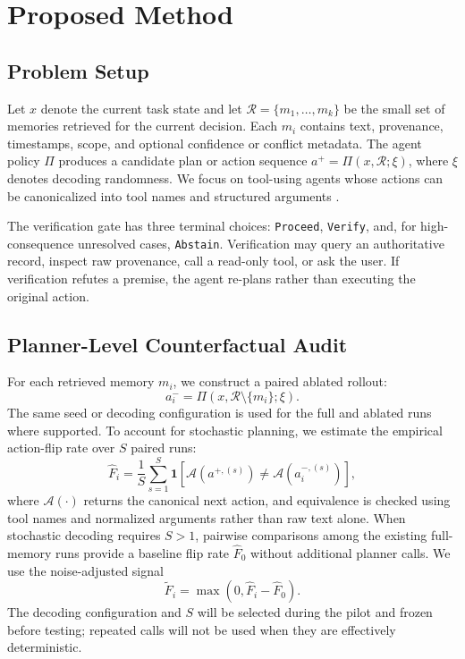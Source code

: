 \documentclass[11pt]{article}
\newcommand{\R}{\mathcal{R}}
\newcommand{\A}{\mathcal{A}}
\begin{document}
\section{Proposed Method}

\subsection{Problem Setup}

Let $x$ denote the current task state and let $\R=\{m_1,\ldots,m_k\}$ be the small set of memories retrieved for the current decision. Each $m_i$ contains text, provenance, timestamps, scope, and optional confidence or conflict metadata. The agent policy $\Pi$ produces a candidate plan or action sequence $a^{+}=\Pi(x,\R;\xi)$, where $\xi$ denotes decoding randomness. We focus on tool-using agents whose actions can be canonicalized into tool names and structured arguments \cite{yao2023react}.

The verification gate has three terminal choices: \texttt{Proceed}, \texttt{Verify}, and, for high-consequence unresolved cases, \texttt{Abstain}. Verification may query an authoritative record, inspect raw provenance, call a read-only tool, or ask the user. If verification refutes a premise, the agent re-plans rather than executing the original action.

\subsection{Planner-Level Counterfactual Audit}

For each retrieved memory $m_i$, we construct a paired ablated rollout:
\begin{equation}
  a_i^{-}=\Pi\!\left(x,\R\setminus\{m_i\};\xi\right).
\end{equation}
The same seed or decoding configuration is used for the full and ablated runs where supported. To account for stochastic planning, we estimate the empirical action-flip rate over $S$ paired runs:
\begin{equation}
  \widehat{F}_i=\frac{1}{S}\sum_{s=1}^{S}
  \mathbf{1}\!\left[\A\!\left(a^{+,(s)}\right)\neq
  \A\!\left(a_i^{-,(s)}\right)\right],
\end{equation}
where $\A(\cdot)$ returns the canonical next action, and equivalence is checked using tool names and normalized arguments rather than raw text alone. When stochastic decoding requires $S>1$, pairwise comparisons among the existing full-memory runs provide a baseline flip rate $\widehat{F}_0$ without additional planner calls. We use the noise-adjusted signal
\begin{equation}
  \widetilde{F}_i=\max\left(0,\widehat{F}_i-\widehat{F}_0\right).
\end{equation}
The decoding configuration and $S$ will be selected during the pilot and frozen before testing; repeated calls will not be used when they are effectively deterministic.
\end{document}
